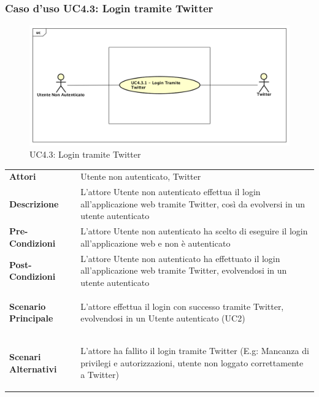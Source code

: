 \newpage
\subsubsection{Caso d'uso UC4.3: Login tramite Twitter }
\label{UC4_2}
\begin{figure}[!htbp]
	\centering
	\includegraphics[scale=0.45]{UML/UC4_3.png}
	\caption{UC4.3: Login tramite Twitter}
\end{figure}

\begin{tabular}{ l | p{11cm}}
	\hline
	\rowcolor{Gray}
	\multicolumn{2}{c}{UC4.3 - Login tramite Twitter} \\
	\hline
	\textbf{Attori} & Utente non autenticato, Twitter \\
	\textbf{Descrizione} & L'attore Utente non autenticato effettua il login all'applicazione web tramite Twitter, così da evolversi in un utente autenticato\\
	\textbf{Pre-Condizioni} & L'attore Utente non autenticato ha scelto di eseguire il login all'applicazione web e non è autenticato \\
	\textbf{Post-Condizioni} & L'attore Utente non autenticato ha effettuato il login all'applicazione web tramite Twitter, evolvendosi in un utente autenticato \\
	\textbf{Scenario Principale} & \begin{enumerate*}[label=(\arabic*.),itemjoin={\newline}]
		\item L'attore effettua il login con successo tramite Twitter, evolvendosi in un Utente autenticato (UC2)
	\end{enumerate*}\\
	\textbf{Scenari Alternativi} & \begin{enumerate*}[label=(\arabic*.),itemjoin={\newline}]
		\item L'attore ha fallito il login tramite Twitter (E.g: Mancanza di privilegi e autorizzazioni, utente non loggato correttamente a Twitter)
	\end{enumerate*}\\
\end{tabular}